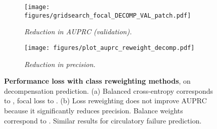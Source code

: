 \documentclass[nohyperref]{article}
\begin{document}
\begin{figure}[h]
\centering
\begin{subfigure}[b]{0.32\textwidth}
  \centering
\texttt{[image: figures/gridsearch\_focal\_DECOMP\_VAL\_patch.pdf]} 
  \caption{\textit{Reduction in AUPRC (validation).}}
\label{fig:grid_focal_decomp}
\end{subfigure} \hspace{4em}
\begin{subfigure}[b]{0.32\textwidth}
  \centering
  \texttt{[image: figures/plot\_auprc\_reweight\_decomp.pdf]}
  \caption{\textit{Reduction in precision.}}
  \label{fig:rw_PR_curve_decomp}
\end{subfigure}
\caption{\textbf{Performance loss with class reweighting methods}, on decompensation prediction. (a) Balanced cross-entropy corresponds to , focal loss to . (b) Loss reweighting does not improve AUPRC because it significantly reduces precision. Balance weights correspond to . Similar results for circulatory failure prediction.}
\label{fig:additional_PR_reweight}
\end{figure}
\end{document}
